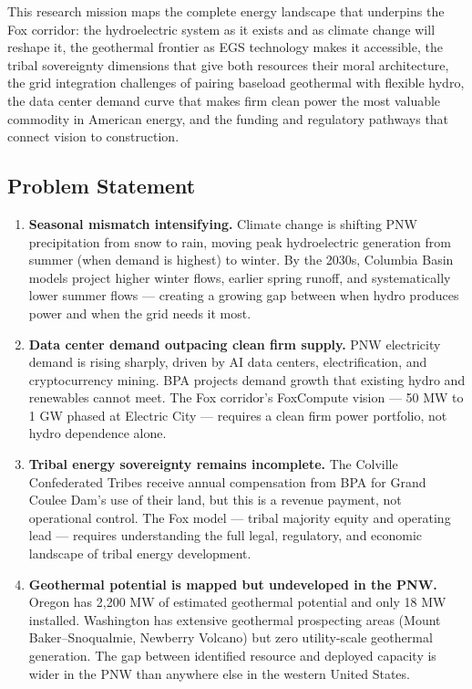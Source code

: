 \documentclass[11pt,letterpaper]{article}
\begin{document}
This research mission maps the complete energy landscape that underpins the Fox corridor: the hydroelectric system as it exists and as climate change will reshape it, the geothermal frontier as EGS technology makes it accessible, the tribal sovereignty dimensions that give both resources their moral architecture, the grid integration challenges of pairing baseload geothermal with flexible hydro, the data center demand curve that makes firm clean power the most valuable commodity in American energy, and the funding and regulatory pathways that connect vision to construction.

\subsection{Problem Statement}

\begin{enumerate}[leftmargin=2em]
\item \textbf{Seasonal mismatch intensifying.} Climate change is shifting PNW precipitation from snow to rain, moving peak hydroelectric generation from summer (when demand is highest) to winter. By the 2030s, Columbia Basin models project higher winter flows, earlier spring runoff, and systematically lower summer flows --- creating a growing gap between when hydro produces power and when the grid needs it most.

\item \textbf{Data center demand outpacing clean firm supply.} PNW electricity demand is rising sharply, driven by AI data centers, electrification, and cryptocurrency mining. BPA projects demand growth that existing hydro and renewables cannot meet. The Fox corridor's FoxCompute vision --- 50 MW to 1 GW phased at Electric City --- requires a clean firm power portfolio, not hydro dependence alone.

\item \textbf{Tribal energy sovereignty remains incomplete.} The Colville Confederated Tribes receive annual compensation from BPA for Grand Coulee Dam's use of their land, but this is a revenue payment, not operational control. The Fox model --- tribal majority equity and operating lead --- requires understanding the full legal, regulatory, and economic landscape of tribal energy development.

\item \textbf{Geothermal potential is mapped but undeveloped in the PNW.} Oregon has 2,200 MW of estimated geothermal potential and only 18 MW installed. Washington has extensive geothermal prospecting areas (Mount Baker--Snoqualmie, Newberry Volcano) but zero utility-scale geothermal generation. The gap between identified resource and deployed capacity is wider in the PNW than anywhere else in the western United States.


\end{enumerate}
\end{document}
